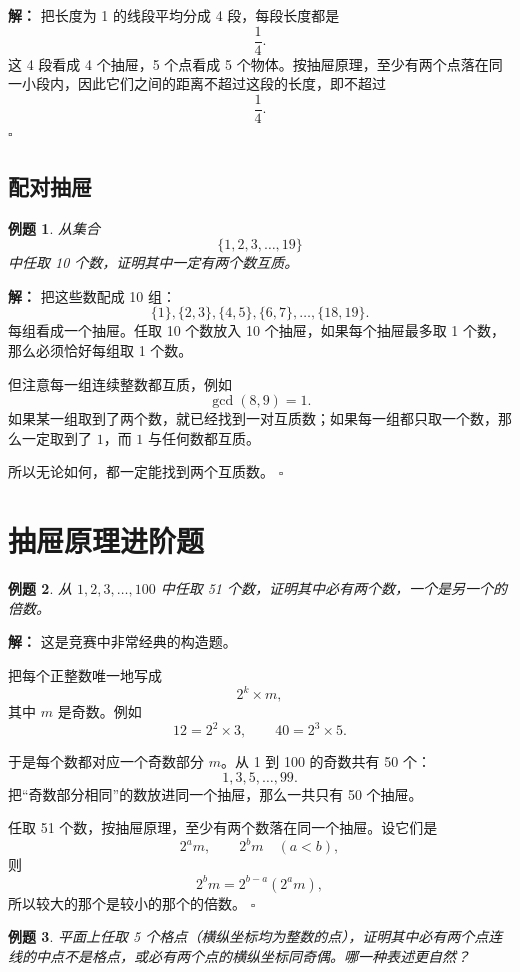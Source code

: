 \documentclass[11pt,a4paper,fontset=fandol]{ctexart}
\theoremstyle{formaltheorem}
\theoremstyle{formalexample}
\newtheorem{example}{例题}[section]
\newenvironment{solution}{\par\noindent\textbf{解：}}{\hfill$\square$\par}
\begin{document}
\begin{solution}
把长度为 1 的线段平均分成 4 段，每段长度都是
\[
\frac14.
\]
这 4 段看成 4 个抽屉，5 个点看成 5 个物体。按抽屉原理，至少有两个点落在同一小段内，因此它们之间的距离不超过这段的长度，即不超过
\[
\frac14.
\]
\end{solution}

\subsection{配对抽屉}
\begin{example}
从集合
\[
\{1,2,3,\ldots,19\}
\]
中任取 10 个数，证明其中一定有两个数互质。
\end{example}

\begin{solution}
把这些数配成 10 组：
\[
\{1\},\{2,3\},\{4,5\},\{6,7\},\ldots,\{18,19\}.
\]
每组看成一个抽屉。任取 10 个数放入 10 个抽屉，如果每个抽屉最多取 1 个数，那么必须恰好每组取 1 个数。

但注意每一组连续整数都互质，例如
\[
\gcd(8,9)=1.
\]
如果某一组取到了两个数，就已经找到一对互质数；如果每一组都只取一个数，那么一定取到了 $1$，而 $1$ 与任何数都互质。

所以无论如何，都一定能找到两个互质数。
\end{solution}

\section{抽屉原理进阶题}

\begin{example}
从 $1,2,3,\ldots,100$ 中任取 51 个数，证明其中必有两个数，一个是另一个的倍数。
\end{example}

\begin{solution}
这是竞赛中非常经典的构造题。

把每个正整数唯一地写成
\[
2^k\times m,
\]
其中 $m$ 是奇数。例如
\[
12=2^2\times 3,\qquad 40=2^3\times 5.
\]

于是每个数都对应一个奇数部分 $m$。从 1 到 100 的奇数共有 50 个：
\[
1,3,5,\ldots,99.
\]
把“奇数部分相同”的数放进同一个抽屉，那么一共只有 50 个抽屉。

任取 51 个数，按抽屉原理，至少有两个数落在同一个抽屉。设它们是
\[
2^a m,\qquad 2^b m \quad (a<b),
\]
则
\[
2^b m=2^{b-a}(2^a m),
\]
所以较大的那个是较小的那个的倍数。
\end{solution}

\begin{example}
平面上任取 5 个格点（横纵坐标均为整数的点），证明其中必有两个点连线的中点不是格点，或必有两个点的横纵坐标同奇偶。哪一种表述更自然？
\end{example}
\end{document}
